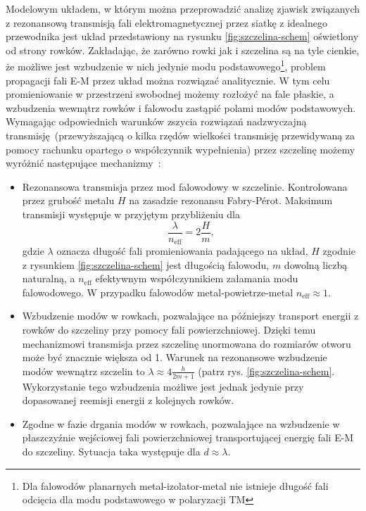 Modelowym układem, w którym można przeprowadzić analizę zjawisk związanych z rezonansową transmisją fali elektromagnetycznej przez siatkę z idealnego przewodnika jest układ przedstawiony na rysunku \ref{fig:szczelina-schem} oświetlony od strony rowków. Zakładając, że zarówno rowki jak i szczelina są na tyle cienkie, że możliwe jest wzbudzenie w nich jedynie modu podstawowego\footnote{Dla falowodów planarnych metal-izolator-metal nie istnieje długość fali odcięcia dla modu podstawowego w polaryzacji TM}, problem propagacji fali E-M przez układ można rozwiązać analitycznie. W tym celu promieniowanie w przestrzeni swobodnej możemy rozłożyć na fale płaskie, a wzbudzenia wewnątrz rowków i falowodu zastąpić polami modów podstawowych. Wymagając odpowiednich warunków zszycia rozwiązań nadzwyczajną transmisję~(przewyższającą o kilka rzędów wielkości transmisję przewidywaną za pomocy rachunku opartego o współczynnik wypełnienia) przez szczelinę możemy wyróżnić następujące mechanizmy~\cite{martin2001theory}:
\begin{itemize}
	\item Rezonansowa transmisja przez mod falowodowy w szczelinie. Kontrolowana przez grubość metalu $H$ na zasadzie rezonansu Fabry-P\'{e}rot. Maksimum transmisji występuje w przyjętym przybliżeniu dla
\begin{equation}
\frac{\lambda}{n_{\textrm{eff}}} = 2 \frac {H}{m},
\label{eq:fp-szczelina}
\end{equation}
gdzie $\lambda$ oznacza długość fali promieniowania padającego na układ, $H$ zgodnie z rysunkiem \ref{fig:szczelina-schem} jest długością falowodu, $m$ dowolną liczbą naturalną, a $n_{\textrm{eff}}$ efektywnym współczynnikiem załamania modu falowodowego. W przypadku falowodów metal-powietrze-metal $n_{\textrm{eff}} \approx 1$.
	\item Wzbudzenie modów w rowkach, pozwalające na późniejszy transport energii z rowków do szczeliny przy pomocy fali powierzchniowej. Dzięki temu mechanizmowi transmisja przez szczelinę unormowana do rozmiarów otworu może być znacznie większa od 1. Warunek na rezonansowe wzbudzenie modów wewnątrz szczelin to $\lambda \approx 4 \frac {h}{2m+1}$ (patrz rys. \ref{fig:szczelina-schem}. Wykorzystanie tego wzbudzenia możliwe jest jednak jedynie przy dopasowanej reemisji energii z kolejnych rowków.
	\item Zgodne w fazie drgania modów w rowkach, pozwalające na wzbudzenie w płaszczyźnie wejściowej fali powierzchniowej transportującej energię fali E-M do szczeliny. Sytuacja taka występuje dla $d \approx \lambda$.
\end{itemize}

